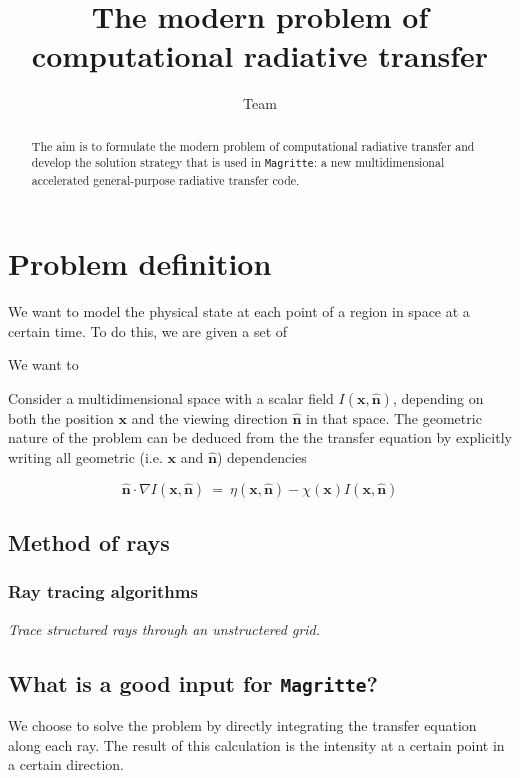\documentclass[]{article}
\title{ The modern problem of computational radiative transfer }
\author{ Team \Magritte }
\date{}
\newcommand{\x}{\textbf{x}}
\newcommand{\n}{\hat{\textbf{n}}}
\newcommand{\e}{ \ = \ }
\newcommand{\Magritte}{\texttt{Magritte}}
\begin{document}
\maketitle


\begin{abstract}
The aim is to formulate the modern problem of computational radiative transfer and develop the solution strategy that is used in \Magritte: a new multidimensional accelerated general-purpose radiative transfer code.
\end{abstract}



\section{Problem definition}


We want to model the physical state at each point of a region in space at a certain time. To do this, we are given a set of

\bigskip

We want to

\bigskip

Consider a multidimensional space with a scalar field $I(\x,\n)$, depending on both the position $\x$ and the viewing direction $\n$ in that space. The geometric nature of the problem can be deduced from the the transfer equation by explicitly writing all geometric (i.e. $\x$ and $\n$) dependencies


\begin{equation}
\n \cdot \nabla I(\x,\n) \e \eta(\x,\n) - \chi(\x) I(\x,\n)
\end{equation}


\subsection{Method of rays}

\subsubsection{Ray tracing algorithms}

\emph{Trace structured rays through an unstructered grid.}

\subsection{What is a good input for \Magritte?}
We choose to solve the problem by directly integrating the transfer equation along each ray. The result of this calculation is the intensity at a certain point in a certain direction.
\end{document}
